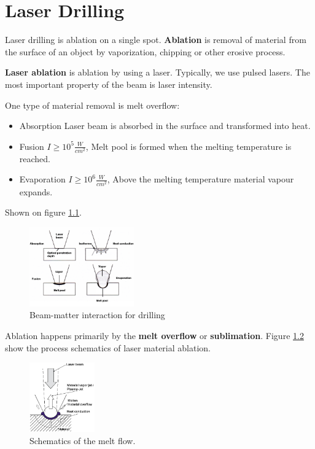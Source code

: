\chapter{Laser Drilling}

Laser drilling is ablation on a single spot.  \textbf{Ablation} is removal of material from the surface of an 
object by vaporization, chipping or other erosive process. 

\textbf{Laser ablation} is ablation by using a laser. Typically, we use pulsed lasers. The most important property of the
beam is laser intensity. 

One type of material removal is melt overflow:
\begin{itemize}
    \item Absorption \pd  Laser beam is absorbed in the  surface and transformed  into heat.
    \item Fusion \pd $I \ge 10^5 \frac{W}{cm^2}$, Melt pool is formed when the melting temperature is reached.
    \item Evaporation \pd $I \ge 10^6 \frac{W}{cm^2}$, Above the melting temperature material vapour expands. 
\end{itemize}
Shown on figure \ref{fig:ldm}.
\begin{figure}[h!]
    \centering
    \includegraphics[width=0.4\textwidth]{slike/ldm.png}
    \caption{Beam-matter interaction for drilling}
    \label{fig:ldm}
\end{figure}
Ablation happens primarily by the \textbf{melt overflow} or \textbf{sublimation}.
Figure \ref{fig:melt} show the process schematics of laser material ablation.
\begin{figure}[h!]
    \centering
    \includegraphics[width=0.25\textwidth]{slike/meltflow.png}
    \caption{Schematics of the melt flow. \sln}
    \label{fig:melt}
\end{figure}

